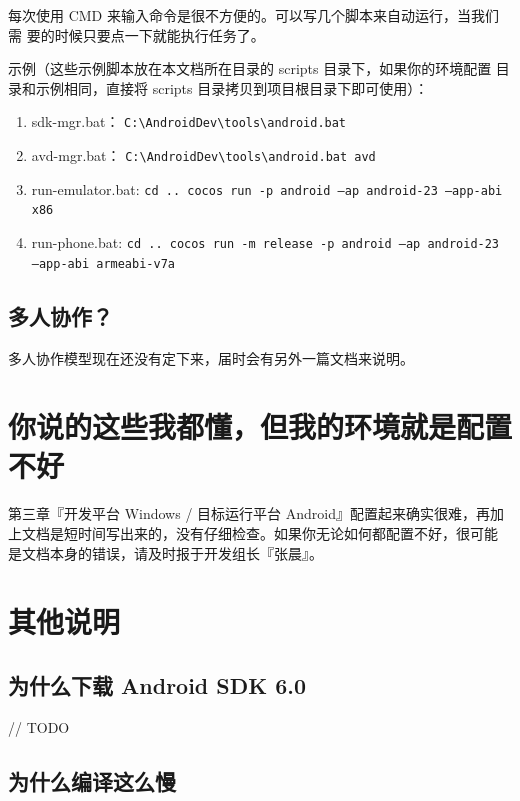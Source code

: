 \documentclass[a4paper, 10pt]{article}
\newcommand{\inlinecode}[1]{\colorbox{inlinecodecolor}{\texttt{#1}}}
\begin{document}
每次使用 CMD 来输入命令是很不方便的。可以写几个脚本来自动运行，当我们需
要的时候只要点一下就能执行任务了。

示例（这些示例脚本放在本文档所在目录的 scripts 目录下，如果你的环境配置
目录和示例相同，直接将 scripts 目录拷贝到项目根目录下即可使用）：

\begin{enumerate}
\item
  sdk-mgr.bat：
  \inlinecode{C:\textbackslash{}AndroidDev\textbackslash{}tools\textbackslash{}android.bat}
\item
  avd-mgr.bat：
  \inlinecode{C:\textbackslash{}AndroidDev\textbackslash{}tools\textbackslash{}android.bat
    avd}
\item run-emulator.bat:
  \inlinecode{cd ..  
    cocos run -p android --ap android-23 --app-abi x86}
\item run-phone.bat:
  \inlinecode{cd ..  
    cocos run -m release -p android --ap android-23 --app-abi
    armeabi-v7a}
\end{enumerate}

\subsection{多人协作？}

多人协作模型现在还没有定下来，届时会有另外一篇文档来说明。

\section{你说的这些我都懂，但我的环境就是配置不好}

第三章『开发平台 Windows / 目标运行平台 Android』配置起来确实很难，再加
上文档是短时间写出来的，没有仔细检查。如果你无论如何都配置不好，很可能
是文档本身的错误，请及时报于开发组长『张晨』。

\section{其他说明}

\subsection{为什么下载 Android SDK 6.0}

// TODO

\subsection{为什么编译这么慢}
\end{document}
